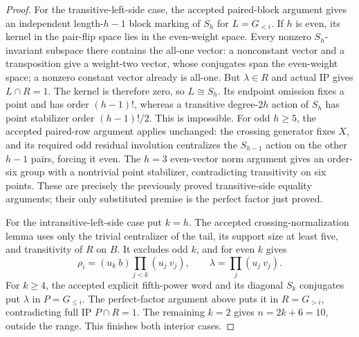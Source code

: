 \documentclass[11pt,a4paper]{article}
\begin{document}
\begin{proof}
For the transitive-left-side case, the accepted paired-block
argument gives an independent length-$h-1$ block marking of
$S_h$ for $L=G_{<i}$. If $h$ is even, its kernel in the
pair-flip space lies in the even-weight space. Every nonzero
$S_h$-invariant subspace there contains the all-one vector:
a nonconstant vector and a transposition give a weight-two
vector, whose conjugates span the even-weight space; a
nonzero constant vector already is all-one. But $\lambda\in R$
and actual IP gives $L\cap R=1$. The kernel is therefore
zero, so $L\cong S_h$. Its endpoint omission fixes a point
and has order $(h-1)!$, whereas a transitive degree-$2h$
action of $S_h$ has point stabilizer order $(h-1)!/2$.
This is impossible. For odd $h\geq5$, the accepted paired-row
argument applies unchanged: the crossing generator fixes $X$,
and its required odd residual involution centralizes the
$S_{h-1}$ action on the other $h-1$ pairs, forcing it even.
The $h=3$ even-vector norm argument gives an order-six group
with a nontrivial point stabilizer, contradicting transitivity
on six points. These are precisely the previously proved
transitive-side equality arguments; their only substituted
premise is the perfect factor just proved.

For the intransitive-left-side case put $k=h$. The accepted
crossing-normalization lemma uses only the trivial centralizer
of the tail, its support size at least five, and transitivity
of $R$ on $B$. It excludes odd $k$, and for even $k$ gives
\[
 \rho_i=(u_k\ b)\prod_{j<k}(u_j\ v_j),\qquad
 \lambda=\prod_j(u_j\ v_j).
\]
For $k\geq4$, the accepted explicit fifth-power word and its
diagonal $S_k$ conjugates put $\lambda$ in
$P=G_{\leq i}$. The perfect-factor argument above puts it
in $R=G_{>i}$, contradicting full IP $P\cap R=1$.
The remaining $k=2$ gives $n=2k+6=10$, outside the range.
This finishes both interior cases.
\end{proof}
\end{document}
